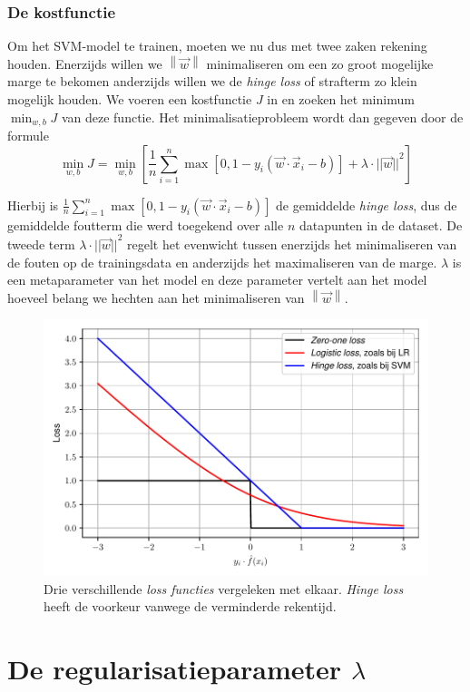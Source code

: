 \documentclass[twoside, kulak]{kulakreport}
\newcommand{\norm}[1]{\left\| #1 \right\|}
\begin{document}
	\subsection{De kostfunctie}
	
	Om het SVM-model te trainen, moeten we nu dus met twee zaken rekening houden. Enerzijds willen we \(\norm{\vec{w}}\) minimaliseren om een zo groot mogelijke marge te bekomen anderzijds willen we de \textit{hinge loss} of strafterm zo klein mogelijk houden. We voeren een kostfunctie \(J\) in en zoeken het minimum \(\min_{w, b}J\) van deze functie. Het minimalisatieprobleem wordt dan gegeven door de formule \[\min_{w, b}J=\min_{w, b}\left[\frac{1}{n}\sum_{i=1}^n{\max{[0,1-y_i(\vec{w}\cdot\vec{x}_i-b)]}} + \lambda\cdot{||\vec{w}||}^2\right]\]
	
	Hierbij is \(\frac{1}{n}\sum_{i=1}^n{\max{[0,1-y_i(\vec{w}\cdot\vec{x}_i-b)]}}\) de gemiddelde \textit{hinge loss}, dus de gemiddelde foutterm die werd toegekend over alle \(n\) datapunten in de dataset. De tweede term \(\lambda\cdot{||\vec{w}||}^2\) regelt het evenwicht tussen enerzijds het minimaliseren van de fouten op de trainingsdata en anderzijds het maximaliseren van de marge. \(\lambda\) is een metaparameter van het model en deze parameter vertelt aan het model hoeveel belang we hechten aan het minimaliseren van \(\norm{\vec{w}}\).
	
	\begin{figure}[h!]
		\centering
		\includegraphics[width=.8\textwidth]{lossfuncties}
		\caption{Drie verschillende \textit{loss functies} vergeleken met elkaar. \textit{Hinge loss} heeft de voorkeur vanwege de verminderde rekentijd.}
		\label{fig:hingeloss}
	\end{figure}
	
	\chapter{De regularisatieparameter \(\lambda\)} 
	
\end{document}
